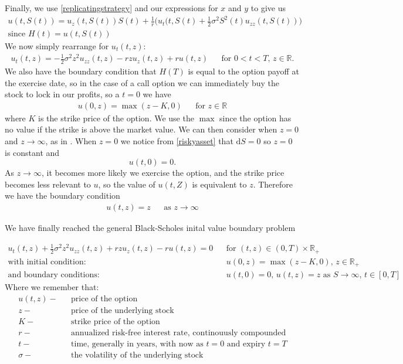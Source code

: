 \documentclass[11pt]{article} %
\begin{document}
Finally, we use \eqref{replicatingstrategy} and our expressions for $x$ and $y$ to give us
\begin{align}
    u(t,S(t)) = u_z(t,S(t))S(t) + \frac{1}{r}\bigg(u_t(t,S(t) + \frac{1}{2}\sigma^2S^2(t)
    u_{zz}(t,S(t))\bigg) \\\text{since $H(t) = u(t,S(t))$}
\end{align}
We now simply rearrange for $u_t(t,z)$:
\begin{align}\label{blackscholes}
    u_t(t,z) = -\frac{1}{2}\sigma^2z^2u_{zz}(t,z) - rzu_z(t,z) + ru(t,z) 
   && \text{for $0<t<T$, $z \in \mathbb{R}$.}
\end{align}
We also have the boundary condition that $H(T)$ is equal to the option payoff at the exercise 
date, so in the case of a call option we can immediately buy the stock to lock in our profits, 
so a $t=0$ we have
\begin{align} \label{initialvalue}
    u(0,z) = \max{(z - K , 0)} && \text{for $z \in \mathbb{R}$}
\end{align}
where $K$ is the strike price of the option. We use the $\max$ since the option has no value 
if the strike is above the market value. We can then consider when $z=0$ and 
$z \to \infty$, as in \cite{scholesapplication}. When $z=0$ we notice from \eqref{riskyasset} 
that $\mathrm{d}S = 0$ so $z = 0$ is constant and
\begin{equation} \label{boundarycondition}
    u(t,0) = 0.
\end{equation}
As $z \to \infty$, it becomes more likely we exercise the option, and the strike price 
becomes less relevant to $u$, so the value of $u(t,Z)$ is equivalent to $z$. Therefore 
we have the boundary condition 
\begin{align} 
    u(t,z) = z && \text{as $z \to \infty$}
\end{align}

We have finally reached the general Black-Scholes inital value boundary problem

\begin{align}
    u_t(t,z) +\frac{1}{2}\sigma^2z^2u_{zz}(t,z) + rzu_z(t,z) - ru(t,z) = 0 &&
    \text{for $(t,z) \in (0,T) \times \mathbb{R}_+ $}\\
    \text{with initial condition: } && u(0,z) = \max{(z-K, 0)} \text{, } 
    z \in \mathbb{R}_+ \\
    \text{and boundary conditions: } && u(t, 0) = 0 \text{,  $u(t,z) = z$ as 
    $S \to \infty $,  $t \in [0,T]$}
\end{align}
Where we remember that: 
\begin{align}
    u(t,z) - && \text{price of the option}\\
    z - && \text{price of the underlying stock}\\
    K - && \text{strike price of the option}\\
    r - && \text{annualized risk-free interest rate, continouusly compounded}\\
    t - && \text{time, generally in years, with now as $t=0$ and expiry $t=T$}\\
    \sigma - && \text{the volatility of the underlying stock}
\end{align}
\end{document}
